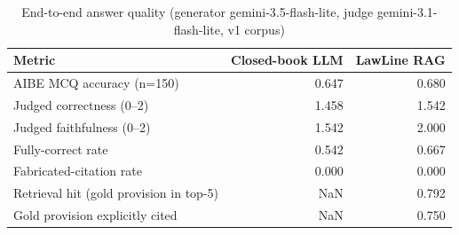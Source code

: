 \begin{table}
\caption{End-to-end answer quality (generator gemini-3.5-flash-lite, judge gemini-3.1-flash-lite, v1 corpus)}
\label{tab:answer}
\begin{tabular}{lrr}
\toprule
Metric & Closed-book LLM & LawLine RAG \\
\midrule
AIBE MCQ accuracy (n=150) & 0.647 & 0.680 \\
Judged correctness (0–2) & 1.458 & 1.542 \\
Judged faithfulness (0–2) & 1.542 & 2.000 \\
Fully-correct rate & 0.542 & 0.667 \\
Fabricated-citation rate & 0.000 & 0.000 \\
Retrieval hit (gold provision in top-5) & NaN & 0.792 \\
Gold provision explicitly cited & NaN & 0.750 \\
\bottomrule
\end{tabular}
\end{table}
